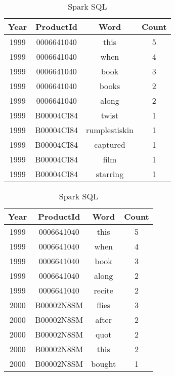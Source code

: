 \begin{itemize}
    \begin{table}[!ht]
      \centering
      \begin{minipage}{.5\textwidth}
        \centering
        \caption{Spark Core}
        \begin{tabular}{cccc}
          \toprule
          Year & ProductId & Word & Count \\
          \midrule
          1999 & 0006641040 & this & 5 \\
          1999 & 0006641040 & when & 4 \\
          1999 & 0006641040 & book & 3 \\
          1999 & 0006641040 & books & 2 \\
          1999 & 0006641040 & along & 2 \\
          1999 & B00004CI84 & twist & 1 \\
          1999 & B00004CI84 & rumplestiskin & 1 \\
          1999 & B00004CI84 & captured & 1 \\
          1999 & B00004CI84 & film & 1 \\
          1999 & B00004CI84 & starring & 1 \\
          \bottomrule
        \end{tabular}
      \end{minipage}%
      \begin{minipage}{.5\textwidth}
        \centering
        \caption{Spark SQL}
        \begin{tabular}{cccc}
          \toprule
          Year & ProductId & Word & Count \\
          \midrule
          1999 & 0006641040 & this & 5 \\
          1999 & 0006641040 & when & 4 \\
          1999 & 0006641040 & book & 3 \\
          1999 & 0006641040 & along & 2 \\
          1999 & 0006641040 & recite & 2 \\
          2000 & B00002N8SM & flies & 3 \\
          2000 & B00002N8SM & after & 2 \\
          2000 & B00002N8SM & quot & 2 \\
          2000 & B00002N8SM & this & 2 \\
          2000 & B00002N8SM & bought & 1 \\
          \bottomrule
        \end{tabular}
      \end{minipage}
    \end{table}
    \newpage
    

\end{itemize}
